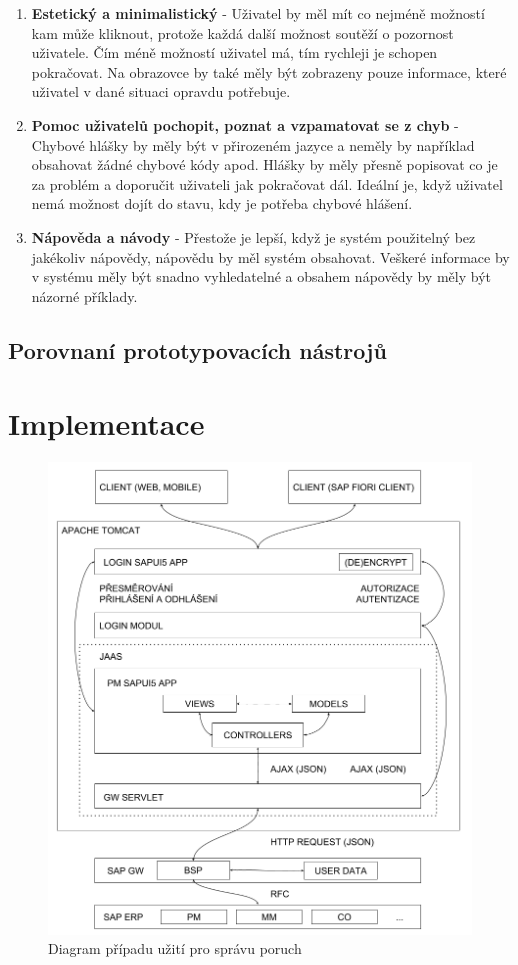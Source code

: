 \documentclass[thesis=M,czech]{FITthesis}[2012/06/26]
\begin{document}
\begin{enumerate}
	\item
	\textbf{Estetický a minimalistický} - Uživatel by měl mít co nejméně možností kam může kliknout, protože každá
	další možnost soutěží o pozornost uživatele. Čím méně možností uživatel má,
	tím rychleji je schopen pokračovat. Na obrazovce by také měly být zobrazeny
	pouze informace, které uživatel v dané situaci opravdu potřebuje.
	\item
	\textbf{Pomoc uživatelů pochopit, poznat a vzpamatovat se z chyb} - Chybové hlášky by měly být v přirozeném jazyce a neměly by například obsahovat
	žádné chybové kódy apod. Hlášky by měly přesně popisovat co je za
	problém a doporučit uživateli jak pokračovat dál. Ideální je, když uživatel
	nemá možnost dojít do stavu, kdy je potřeba chybové hlášení.
	\item
	\textbf{Nápověda a návody} - Přestože je lepší, když je systém použitelný bez jakékoliv nápovědy, nápovědu
	by měl systém obsahovat. Veškeré informace by v systému měly být snadno
	vyhledatelné a obsahem nápovědy by měly být názorné příklady.
\end{enumerate} 

\section{Porovnaní prototypovacích nástrojů}


\chapter{Implementace}

\begin{figure}[H]
	\centering
	\includegraphics[width=1\textwidth]{images/architektura}
	\caption{Diagram případu užití pro správu poruch}
	\label{img:uc_sprava_poruch}
\end{figure}
\end{document}
